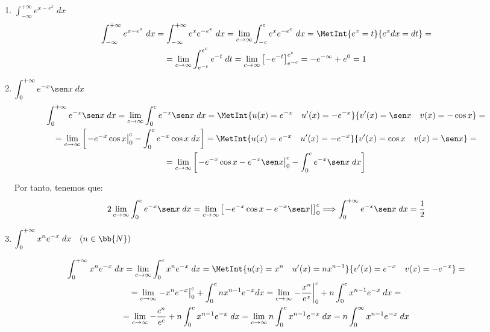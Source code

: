 \begin{ejercicio}
\begin{enumerate}
    \item $\displaystyle \int_{-\infty}^{+\infty} e^{x-e^x}\;dx$
    \begin{multline*}
        \int_{-\infty}^{+\infty} e^{x-e^x}\;dx
        = \int_{-\infty}^{+\infty} e^{x}e^{-e^x}\;dx
        = \lim_{c\to \infty}\int_{-c}^c e^{x}e^{-e^x}\;dx
        = \MetInt{e^x = t}{e^x dx = dt}
        =\\
        =\lim_{c\to \infty}\int_{e^{-c}}^{e^c} e^{-t}\;dt
        =\lim_{c\to \infty} \left[-e^{-t}\right]_{e^{-c}}^{e^c}
        = -e^{-\infty} +e^0 = 1
    \end{multline*}
    
    \item $\displaystyle \int_{0}^{+\infty} e^{-x}\sen x\;dx$
    \begin{multline*}
        \int_{0}^{+\infty} e^{-x}\sen x\;dx
        = \lim_{c\to \infty} \int_{0}^{c} e^{-x}\sen x\;dx
        = \MetInt{u(x) = e^{-x}\quad u'(x)=-e^{-x}}{v'(x)=\sen x \quad v(x)=-\cos x}
        =\\= \lim_{c\to \infty}\left[\left.-e^{-x}\cos x\right|_0^c -\int_0^c e^{-x}\cos x\;dx\right]
        = \MetInt{u(x) = e^{-x}\quad u'(x)=-e^{-x}}{v'(x)=\cos x \quad v(x)=\sen x}
        =\\= \lim_{c\to \infty}\left[\left.-e^{-x}\cos x-e^{-x}\sen x\right|_0^c -\int_0^c e^{-x}\sen x\;dx\right]
    \end{multline*}

    Por tanto, tenemos que:
    \begin{equation*}
        2\lim_{c\to \infty} \int_{0}^{c} e^{-x}\sen x\;dx = \lim_{c\to \infty}\left[\left.-e^{-x}\cos x-e^{-x}\sen x\right|\right]_0^c \Longrightarrow \int_{0}^{+\infty} e^{-x}\sen x\;dx = \frac{1}{2}
    \end{equation*}

    \item $\displaystyle \int_{0}^{+\infty} x^ne^{-x}\;dx \quad (n\in \bb{N})$

    \begin{multline*}
        \int_{0}^{+\infty} x^ne^{-x}\;dx = \lim_{c\to \infty} \int_{0}^{c} x^ne^{-x}\;dx
        = \MetInt{u(x)=x^n \quad u'(x)=nx^{n-1}}{v'(x)=e^{-x}\quad v(x)=-e^{-x}}
        =\\=
        \lim_{c\to \infty}\left.-x^ne^{-x}\right|_0^c +\int_0^c nx^{n-1}e^{-x}dx
        = \lim_{c\to \infty}
        \left.-\frac{x^n}{e^x}\right|_0^c +n\int_0^c x^{n-1}e^{-x}\;dx
        =\\
        = \lim_{c\to \infty}
        -\frac{c^n}{e^c} +n\int_0^c x^{n-1}e^{-x}\;dx
        = \lim_{c\to \infty}
        n\int_0^c x^{n-1}e^{-x}\;dx
        = n\int_0^{\infty}x^{n-1}e^{-x}\;dx
    \end{multline*}


\end{enumerate}
\end{ejercicio}
